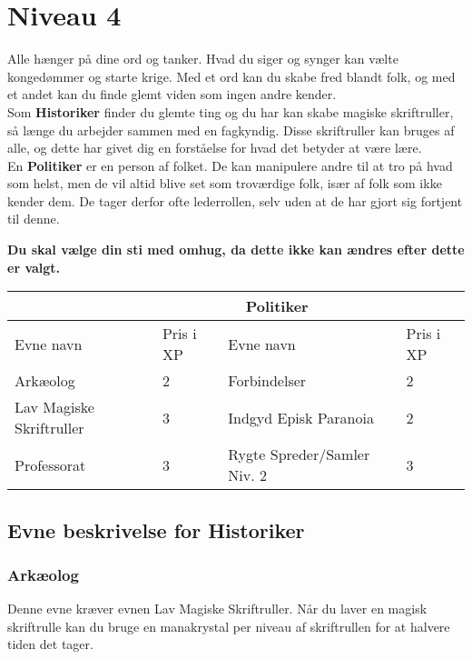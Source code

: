 \chapter*{Niveau 4}
Alle hænger på dine ord og tanker. Hvad du siger og synger kan vælte kongedømmer og starte krige. Med et ord kan du skabe fred blandt folk, og med et andet kan du finde glemt viden som ingen andre kender.\\
Som \textbf{Historiker} finder du glemte ting og du har kan skabe magiske skriftruller, så længe du arbejder sammen med en fagkyndig. Disse skriftruller kan bruges af alle, og dette har givet dig en forståelse for hvad det betyder at være lære.\\
En \textbf{Politiker} er en person af folket. De kan manipulere andre til at tro på hvad som helst, men de vil altid blive set som troværdige folk, især af folk som ikke kender dem. De tager derfor ofte lederrollen, selv uden at de har gjort sig fortjent til denne.

\textbf{Du skal vælge din sti med omhug, da dette ikke kan ændres efter dette er valgt.}\\


\begin{tabular}{|p{}|p{}|p{}|p{}|}
\hline
\rowcolor{cerulean!80}
 \multicolumn{2}{|c|}{ Historiker } & \multicolumn{2}{|c|}{ Politiker }\\
\hline
\rowcolor{cerulean!40}
    Evne navn & Pris i XP & Evne navn & Pris i XP\\ \hline
    Arkæolog & 2 & Forbindelser & 2\\\hline
    Lav Magiske Skriftruller & 3 & Indgyd Episk Paranoia& 2\\\hline
    Professorat & 3 & Rygte Spreder/Samler Niv. 2& 3\\\hline
\end{tabular}

\section*{Evne beskrivelse for Historiker}

\subsection*{Arkæolog}
Denne evne kræver evnen Lav Magiske Skriftruller. Når du laver en magisk skriftrulle kan du bruge en manakrystal per niveau af skriftrullen for at halvere tiden det tager. 


